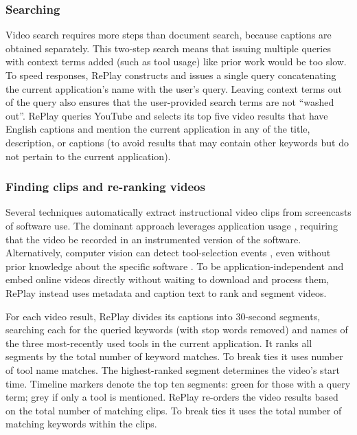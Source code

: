 \subsubsection{Searching}
Video search requires more steps than document search, because captions are obtained separately. This two-step search means that issuing multiple queries with context terms added (such as tool usage) like prior work \cite{Ekstrand2011} would be too slow. To speed responses, RePlay constructs and issues a single query concatenating the current application's name with the user's query. Leaving context terms out of the query also ensures that the user-provided search terms are not ``washed out''. RePlay queries YouTube and selects its top five video results that have English captions and mention the current application in any of the title, description, or captions (to avoid results that may contain other keywords but do not pertain to the current application).

\subsubsection{Finding clips and re-ranking videos}
Several techniques automatically extract instructional video clips from screencasts of software use. The dominant approach leverages application usage \cite{Grossman2010, Lafreniere2014, Chi2012, Wang2018}, requiring that the video be recorded in an instrumented version of the software. Alternatively, computer vision can detect tool-selection events \cite{Pongnumkul2011, Matejka2011}, even without prior knowledge about the specific software \cite{Banovic2012}. To be application-independent and embed online videos directly without waiting to download and process them, RePlay instead uses metadata and caption text to rank and segment videos. 

For each video result, RePlay divides its captions into 30-second segments, searching each for the queried keywords (with stop words removed) and names of the three most-recently used tools in the current application. It ranks all segments by the total number of keyword matches. To break ties it uses number of tool name matches. The highest-ranked segment determines the video's start time. Timeline markers denote the top ten segments: green for those with a query term; grey if only a tool is mentioned. RePlay re-orders the video results based on the total number of matching clips. To break ties it uses the total number of matching keywords within the clips.

